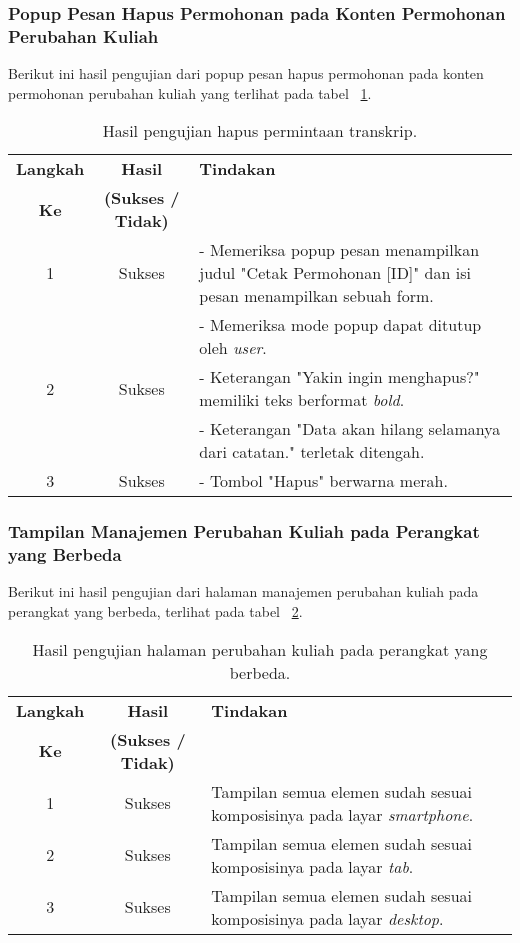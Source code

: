 \subsubsection{Popup Pesan Hapus Permohonan pada Konten Permohonan Perubahan Kuliah}
Berikut ini hasil pengujian dari popup pesan hapus permohonan pada konten permohonan perubahan kuliah yang terlihat pada tabel ~\ref{hasil:HapusPerubahanKuliah}.
\begin{table}[H]
	\centering 
	\caption{Hasil pengujian hapus permintaan transkrip.}
	\label{hasil:HapusPerubahanKuliah}
	\begin{tabular}{|c| c| p{}|}
		\toprule
		\textbf{Langkah} & \textbf{Hasil} & \textbf{Tindakan}\\
		\textbf{Ke} & \textbf{(Sukses / Tidak)} &\\
		\midrule
		1&Sukses& - Memeriksa popup pesan menampilkan judul "Cetak Permohonan [ID]" dan isi pesan menampilkan sebuah form.\\
		&& - Memeriksa mode popup dapat ditutup oleh \textit{user}.\\
		\hline
		2&Sukses& - Keterangan "Yakin ingin menghapus?" memiliki teks berformat \textit{bold}. \\
		&& - Keterangan "Data akan hilang selamanya dari catatan." terletak ditengah.\\
		\hline
		3&Sukses&- Tombol "Hapus" berwarna merah.\\	
		\bottomrule		
	\end{tabular} 
\end{table}

\subsubsection{Tampilan Manajemen Perubahan Kuliah pada Perangkat yang Berbeda}
Berikut ini hasil pengujian dari halaman manajemen perubahan kuliah pada perangkat yang berbeda, terlihat pada tabel ~\ref{hasil:ManajemenPerubahanKuliahDevices}.
\begin{table}[H]
	\centering 
	\caption{Hasil pengujian halaman perubahan kuliah pada perangkat yang berbeda.}
	\label{hasil:ManajemenPerubahanKuliahDevices}
	\begin{tabular}{|c|c|p{}|}
		\toprule
		\textbf{Langkah} & \textbf{Hasil} & \textbf{Tindakan}\\
		\textbf{Ke} & \textbf{(Sukses / Tidak)} & \\		
		\midrule
		1 & Sukses & Tampilan semua elemen sudah sesuai komposisinya pada layar \textit{smartphone}.\\
		\hline
		2 & Sukses & Tampilan semua elemen sudah sesuai komposisinya pada layar \textit{tab}.\\
		\hline
		3 & Sukses & Tampilan semua elemen sudah sesuai komposisinya pada layar \textit{desktop}.\\
		\hline
		\bottomrule		
	\end{tabular} 
\end{table}

